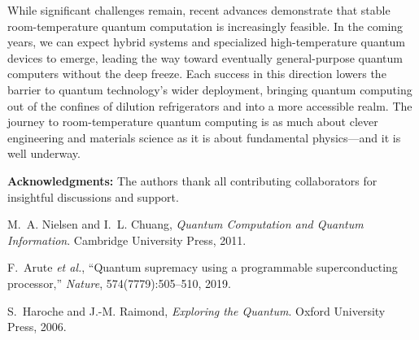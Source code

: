 \documentclass[11pt]{article}
\begin{document}
While significant challenges remain, recent advances demonstrate that stable room-temperature quantum computation is increasingly feasible. In the coming years, we can expect hybrid systems and specialized high-temperature quantum devices to emerge, leading the way toward eventually general-purpose quantum computers without the deep freeze. Each success in this direction lowers the barrier to quantum technology’s wider deployment, bringing quantum computing out of the confines of dilution refrigerators and into a more accessible realm. The journey to room-temperature quantum computing is as much about clever engineering and materials science as it is about fundamental physics---and it is well underway.

\vspace{1em}
\noindent \textbf{Acknowledgments:} The authors thank all contributing collaborators for insightful discussions and support.

\begin{thebibliography}{99}

M.~A. Nielsen and I.~L. Chuang, \emph{Quantum Computation and Quantum Information}.
Cambridge University Press, 2011.

F.~Arute \emph{et al.}, ``Quantum supremacy using a programmable superconducting processor,''
\emph{Nature}, 574(7779):505--510, 2019.

S.~Haroche and J.-M. Raimond, \emph{Exploring the Quantum}.
Oxford University Press, 2006.


\end{thebibliography}
\end{document}
